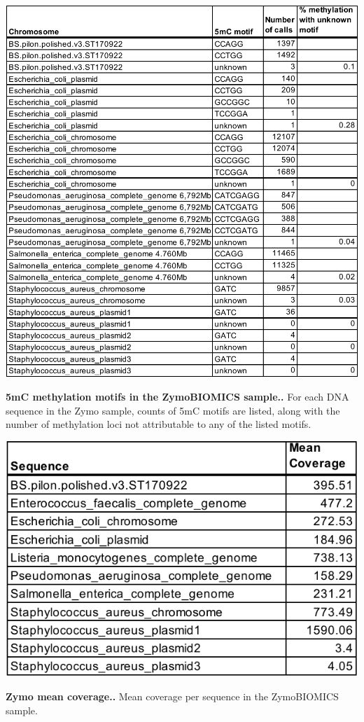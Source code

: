 \begin{table}[!hb]
\centering
\includegraphics[width = 1\linewidth,keepaspectratio]{figure/bisulf.pdf}
\caption[5mC methylation motifs in the ZymoBIOMICS sample.]{{\bf 5mC methylation motifs in the ZymoBIOMICS sample..} For each DNA sequence in the Zymo sample, counts of 5mC motifs are listed, along with the number of methylation loci not attributable to any of the listed motifs. }
\label{tab:bisulf}
\end{table}


\begin{table}[!hb]
\centering
\includegraphics[width = .5\linewidth,keepaspectratio]{figure/meancov.pdf}
\caption[Zymo mean coverage.]{{\bf Zymo mean coverage..} Mean coverage per sequence in the ZymoBIOMICS sample. }
\label{tab:meancov}
\end{table}


